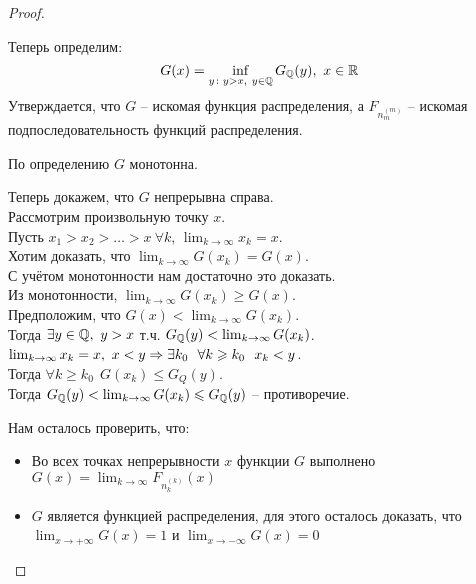 \begin{proof}
\begin{itemize}
        Теперь определим:
        \[
            G(x) = \inf_{y \colon y>x,\ y \in \mathbb{Q}} G_{\mathbb{Q}}(y),\ x \in \mathbb{R}
        \]
        Утверждается, что $G$ -- искомая функция распределения, а $F_{n^{(m)}_m}$ -- искомая подпоследовательность функций распределения.

        По определению $G$ монотонна.

        Теперь докажем, что $G$ непрерывна справа. \\
        Рассмотрим произвольную точку $x$. \\
        Пусть $x_1 > x_2 > \ldots > x \ \forall k$, $\lim_{k \to \infty} x_k = x$. \\
        Хотим доказать, что $\lim_{k \to \infty} G(x_k) = G(x)$. \\
        С учётом монотонности нам достаточно это доказать. \\
        Из монотонности, $\lim_{k \to \infty} G(x_k) \geqslant G(x)$. \\
        Предположим, что $G(x) < \lim_{k \to \infty} G(x_k)$. \\
        Тогда $\exists y \in \mathbb{Q},\ y > x$ т.ч. $G_{\mathbb{Q}}(y) < \lim_{k \to \infty} G(x_k)$. \\
        $\lim_{k \to \infty} x_k = x,\ x<y \Rightarrow \exists k_0 \ \ \forall k \geqslant k_0 \ \ x_k<y$. \\
        Тогда $\forall k \geqslant k_0 \ \ G(x_k) \leqslant G_{Q}(y)$. \\
        Тогда $G_{\mathbb{Q}}(y) < \lim_{k \to \infty} G(x_k) \leqslant G_{\mathbb{Q}}(y)$ -- противоречие.
        
        Нам осталось проверить, что:
        \begin{itemize}
            \item Во всех точках непрерывности $x$ функции $G$ выполнено $G(x) = \lim_{k \to \infty} F_{n^{(k)}_k}(x)$
            \item $G$ является функцией распределения, для этого осталось доказать, что $\lim_{x \to +\infty} G(x) = 1$ и $\lim_{x \to -\infty} G(x) = 0$
        \end{itemize}


\end{itemize}
\end{proof}
